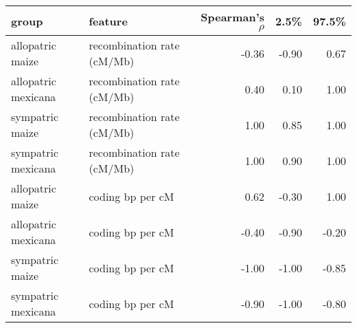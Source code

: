 \begin{table}[ht]
\centering
\begin{tabular}{llrrr}
  \hline
group & feature & Spearman's $\rho$ & 2.5\% & 97.5\% \\ 
  \hline
allopatric maize & recombination rate (cM/Mb) & -0.36 & -0.90 & 0.67 \\ 
  allopatric mexicana & recombination rate (cM/Mb) & 0.40 & 0.10 & 1.00 \\ 
  sympatric maize & recombination rate (cM/Mb) & 1.00 & 0.85 & 1.00 \\ 
  sympatric mexicana & recombination rate (cM/Mb) & 1.00 & 0.90 & 1.00 \\ 
  allopatric maize & coding bp per cM & 0.62 & -0.30 & 1.00 \\ 
  allopatric mexicana & coding bp per cM & -0.40 & -0.90 & -0.20 \\ 
  sympatric maize & coding bp per cM & -1.00 & -1.00 & -0.85 \\ 
  sympatric mexicana & coding bp per cM & -0.90 & -1.00 & -0.80 \\ 
   \hline
\end{tabular}
\end{table}
